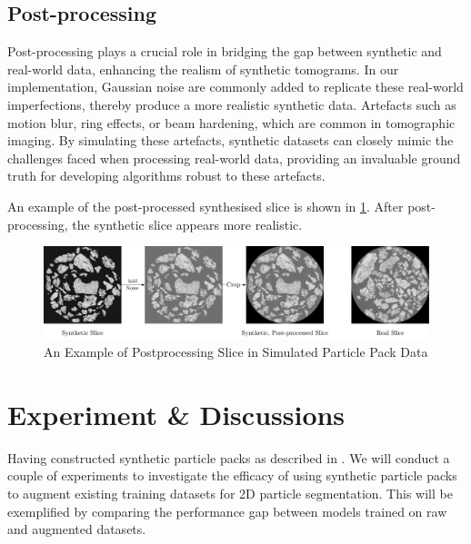 \documentclass[preprint,12pt]{elsarticle}
\begin{document}
\subsection{Post-processing}
Post-processing plays a crucial role in bridging the gap between synthetic and real-world data, enhancing the realism of synthetic tomograms. 
In our implementation, Gaussian noise are commonly added to replicate these real-world imperfections, thereby produce a more realistic synthetic data.
Artefacts such as motion blur, ring effects, or beam hardening, which are common in tomographic imaging. 
By simulating these artefacts, synthetic datasets can closely mimic the challenges faced when processing real-world data, providing an invaluable ground truth for developing algorithms robust to these artefacts.
\par
An example of the post-processed synthesised slice is shown in \cref{fig:syn:postprocess}. 
After post-processing, the synthetic slice appears more realistic.
\begin{figure}[H]
    \includegraphics[width=\textwidth]{figures/pdf/postprocess.pdf}
    \caption{An Example of Postprocessing Slice in Simulated Particle Pack Data}
    \label{fig:syn:postprocess}
\end{figure}

\section{Experiment \& Discussions}

Having constructed synthetic particle packs as described in . 
We will conduct a couple of experiments to investigate the efficacy of using synthetic particle packs to augment existing training datasets for 2D particle segmentation.
This will be exemplified by comparing the performance gap between models trained on raw and augmented datasets.
\end{document}
